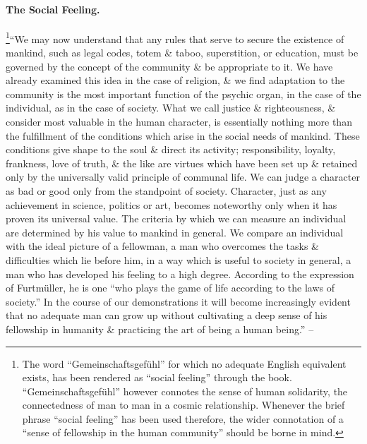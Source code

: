 \documentclass{article}
\begin{document}
\paragraph{The Social Feeling.} \footnote{The word ``Gemeinschaftsgef\"uhl'' for which no adequate English equivalent exists, has been rendered as ``social feeling'' through the book. ``Gemeinschaftsgef\"uhl'' however connotes the sense of human solidarity, the connectedness of man to man in a cosmic relationship. Whenever the brief phrase ``social feeling'' has been used therefore, the wider connotation of a ``sense of fellowship in the human community'' should be borne in mind.}``We may now understand that any rules that serve to secure the existence of mankind, such as legal codes, totem \& taboo, superstition, or education, must be governed by the concept of the community \& be appropriate to it. We have already examined this idea in the case of religion, \& we find adaptation to the community is the most important function of the psychic organ, in the case of the individual, as in the case of society. What we call justice \& righteousness, \& consider most valuable in the human character, is essentially nothing more than the fulfillment of the conditions which arise in the social needs of mankind. These conditions give shape to the soul \& direct its activity; responsibility, loyalty, frankness, love of truth, \& the like are virtues which have been set up \& retained only by the universally valid principle of communal life. We can judge a character as bad or good only from the standpoint of society. Character, just as any achievement in science, politics or art, becomes noteworthy only when it has proven its universal value. The criteria by which we can measure an individual are determined by his value to mankind in general. We compare an individual with the ideal picture of a fellowman, a man who overcomes the tasks \& difficulties which lie before him, in a way which is useful to society in general, a man who has developed his feeling to a high degree. According to the expression of Furtm\"uller, he is one ``who plays the game of life according to the laws of society.'' In the course of our demonstrations it will become increasingly evident that no adequate man can grow up without cultivating a deep sense of his fellowship in humanity \& practicing the art of being a human being.'' -- \cite[pp. 31--32]{Adler_human_nature}
\end{document}
